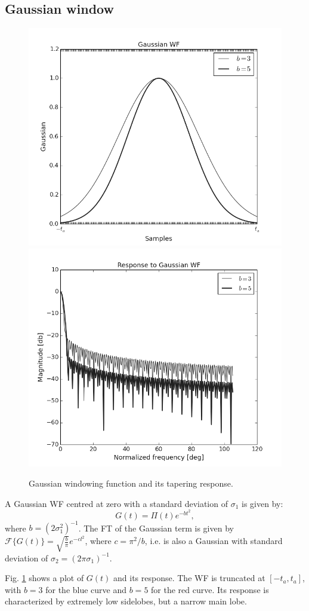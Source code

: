 \documentclass[useAMS,usenatbib]{mn2e}
\begin{document}
\subsection{Gaussian window}
\begin{figure}
\includegraphics[width=.5\textwidth]{./Figures/gaussiangrey.png}%
\includegraphics[width=.5\textwidth]{./Figures/freq_resp_gaussiangrey.png}
\caption{Gaussian windowing function and its tapering response.}\label{fig:wf:gauss}
\end{figure}
A Gaussian WF centred at zero with a standard deviation of $\sigma_1$ is given by: 
\begin{equation}
  G(t)= \Pi(t) e^{-bt^{2}}, \label{eq:gauss}
\end{equation}
where $b=(2\sigma_1^2)^{-1}$. The FT of the Gaussian term is given by 
$\mathcal{F}\big\{G(t)\big\}=\sqrt{\frac{b}{\pi}}e^{-cl^2}$, where $c=\pi^2/b$, i.e.
is also a Gaussian with standard deviation of $\sigma_2= (2\pi\sigma_1)^{-1}$.

Fig. \ref{fig:wf:gauss} shows a plot of $G(t)$ and its response. The WF is truncated at $[-t_a,t_a]$, with $b = 3$ for the blue curve and $b=5$ for the red curve. Its response is characterized by extremely low sidelobes, but a narrow main lobe.
\end{document}
